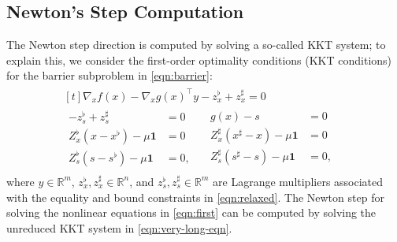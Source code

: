 \subsection{Newton's Step Computation}
The Newton step direction is computed by solving a so-called KKT system; to explain this, we consider the first-order optimality conditions (KKT conditions) for the barrier subproblem in \eqref{eqn:barrier}:
\begin{align}\label{eqn:first}
  \begin{aligned}[t]
    \nabla_{x} f(x) - \nabla_{x}g(x)^\top y  - z_x^\flat  + z_x^\sharp = 0\;&\\
    \begin{aligned}
      - z_s^\flat  + z_s^\sharp  &= 0\\
      Z^\flat_x (x-x^\flat) - \mu\boldsymbol{1} &= 0\\
      Z^\flat_s (s-s^\flat) - \mu\boldsymbol{1}&= 0,
    \end{aligned}
    \quad
    \begin{aligned}
      g(x) - s  &= 0\\
      Z^\sharp_x (x^\sharp-x) - \mu\boldsymbol{1}&= 0\\
      Z^\sharp_s (s^\sharp-s) - \mu\boldsymbol{1}&= 0,
    \end{aligned}&
  \end{aligned}
\end{align}
where $y\in\mathbb{R}^{m}$, $z_x^\flat,z_x^\sharp\in\mathbb{R}^{n}$,
and $z_s^\flat,z_s^\sharp\in\mathbb{R}^{m}$ are Lagrange multipliers
associated with the equality and bound constraints in
\eqref{eqn:relaxed}. The Newton step for solving the nonlinear
equations in \eqref{eqn:first} can be computed by solving the unreduced KKT system in \eqref{eqn:very-long-eqn}.
